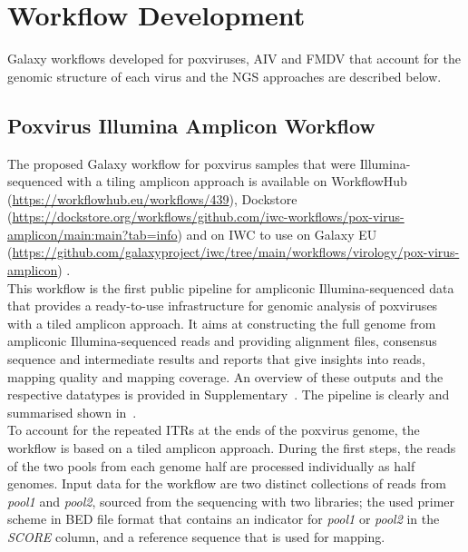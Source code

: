 \section{Workflow Development}
Galaxy workflows developed for poxviruses, \ac{AIV} and \ac{FMDV} that account for the genomic structure of each virus and the NGS approaches are described below.

\subsection{Poxvirus Illumina Amplicon Workflow}\label{sec:pox-wf}
The proposed Galaxy workflow for poxvirus samples that were Illumina-sequenced with a tiling amplicon approach is available on WorkflowHub (\url{https://workflowhub.eu/workflows/439}), Dockstore (\url{https://dockstore.org/workflows/github.com/iwc-workflows/pox-virus-amplicon/main:main?tab=info}) and on \ac{IWC} to use on Galaxy EU (\url{https://github.com/galaxyproject/iwc/tree/main/workflows/virology/pox-virus-amplicon}) . \\
This workflow is the first public pipeline for ampliconic Illumina-sequenced data that provides a ready-to-use infrastructure for genomic analysis of poxviruses with a tiled amplicon approach. It aims at constructing the full genome from ampliconic Illumina-sequenced reads and providing alignment files, consensus sequence and intermediate results and reports that give insights into reads, mapping quality and mapping coverage. An overview of these outputs and the respective datatypes is provided in Supplementary~. The pipeline is clearly and summarised shown in~. \\ 
To account for the repeated \acp{ITR} at the ends of the poxvirus genome, the workflow is based on a tiled amplicon approach. During the first steps, the reads of the two pools from each genome half are processed individually as half genomes. Input data for the workflow are two distinct collections of reads from \textit{pool1} and \textit{pool2}, sourced from the sequencing with two libraries; the used primer scheme in \ac{BED} file format that contains an indicator for \textit{pool1} or \textit{pool2} in the \textit{SCORE} column, and a reference sequence that is used for mapping. 

